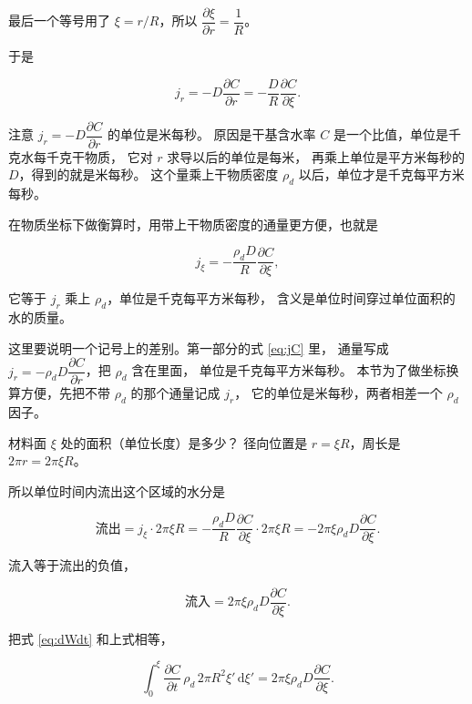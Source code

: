 最后一个等号用了 $\xi=r/R$，所以 $\dfrac{\partial\xi}{\partial r}=\dfrac{1}{R}$。

于是

\begin{equation}
j_r = -D\frac{\partial C}{\partial r} = -\frac{D}{R}\frac{\partial C}{\partial \xi}.
\end{equation}

注意 $j_r=-D\dfrac{\partial C}{\partial r}$ 的单位是米每秒。
原因是干基含水率 $C$ 是一个比值，单位是千克水每千克干物质，
它对 $r$ 求导以后的单位是每米，
再乘上单位是平方米每秒的 $D$，得到的就是米每秒。
这个量乘上干物质密度 $\rho_d$ 以后，单位才是千克每平方米每秒。

在物质坐标下做衡算时，用带上干物质密度的通量更方便，也就是

\begin{equation}
j_\xi = -\frac{\rho_d D}{R}\frac{\partial C}{\partial \xi},
\end{equation}

它等于 $j_r$ 乘上 $\rho_d$，单位是千克每平方米每秒，
含义是单位时间穿过单位面积的水的质量。

这里要说明一个记号上的差别。第一部分的式 \eqref{eq:jC} 里，
通量写成 $j_r=-\rho_d D\dfrac{\partial C}{\partial r}$，把 $\rho_d$ 含在里面，
单位是千克每平方米每秒。
本节为了做坐标换算方便，先把不带 $\rho_d$ 的那个通量记成 $j_r$，
它的单位是米每秒，两者相差一个 $\rho_d$ 因子。

材料面 $\xi$ 处的面积（单位长度）是多少？
径向位置是 $r=\xi R$，周长是 $2\pi r = 2\pi\xi R$。

所以单位时间内流出这个区域的水分是

\begin{equation}
\text{流出} = j_\xi\cdot 2\pi\xi R
= -\frac{\rho_d D}{R}\frac{\partial C}{\partial \xi}\cdot 2\pi\xi R
= -2\pi\xi\rho_d D\frac{\partial C}{\partial \xi}.
\end{equation}

流入等于流出的负值，

\begin{equation}
\text{流入} = 2\pi\xi\rho_d D\frac{\partial C}{\partial \xi}.
\end{equation}

把式 \eqref{eq:dWdt} 和上式相等，

\begin{equation}
\int_0^\xi \frac{\partial C}{\partial t}\,\rho_d\,2\pi R^2\xi'\,\mathrm{d}\xi'
= 2\pi\xi\rho_d D\frac{\partial C}{\partial \xi}.
\label{eq:materialbalance}
\end{equation}

